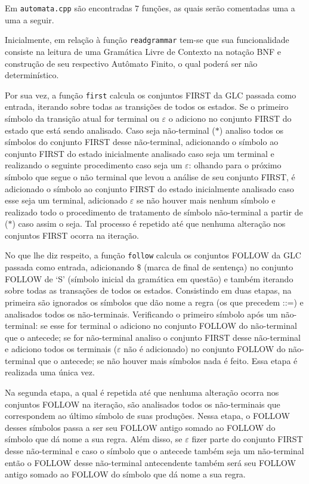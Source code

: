 \documentclass[12pt]{article}
\theoremstyle{definition}
\begin{document}
Em \texttt{automata.cpp} são encontradas  $7$ funções, as quais serão comentadas uma a uma a seguir.

Inicialmente, em relação à função \texttt{readgrammar} tem-se que sua funcionalidade consiste na leitura de uma Gramática Livre de Contexto na notação BNF e construção de seu respectivo Autômato Finito, o qual poderá ser não determinístico.

Por sua vez, a função \texttt{first} calcula os conjuntos FIRST da GLC passada como entrada, iterando sobre todas as transições de todos os estados. Se o primeiro símbolo da transição atual for terminal ou $\varepsilon$ o adiciono no conjunto FIRST do estado que está sendo analisado. Caso seja não-terminal ($*$) analiso todos os símbolos do conjunto FIRST desse não-terminal, adicionando o símbolo ao conjunto FIRST do estado inicialmente analisado caso seja um terminal e realizando o seguinte procedimento caso seja um $\varepsilon$: olhando para o próximo símbolo que segue o não terminal que levou a análise de seu conjunto FIRST, é adicionado o símbolo ao conjunto FIRST do estado inicialmente analisado caso esse seja um terminal, adicionado $\varepsilon$ se não houver mais nenhum símbolo e realizado todo o procedimento de tratamento de símbolo não-terminal a partir de ($*$) caso assim o seja. Tal processo é repetido até que nenhuma alteração nos conjuntos FIRST ocorra na iteração.

No que lhe diz respeito, a função \texttt{follow} calcula os conjuntos FOLLOW da GLC passada como entrada, adicionando $\$$ (marca de final de sentença) no conjunto FOLLOW de `S' (símbolo inicial da gramática em questão) e também iterando sobre todas as transações de todos os estados. Consistindo em duas etapas, na primeira são ignorados os símbolos que dão nome a regra (os que precedem ::=) e analisados todos os não-terminais. Verificando o primeiro símbolo após um não-terminal: se esse for terminal o adiciono no conjunto FOLLOW do não-terminal que o antecede; se for não-terminal analiso o conjunto FIRST desse não-terminal e adiciono todos os terminais ($\varepsilon$ não é adicionado) no conjunto FOLLOW do não-terminal que o antecede; se não houver mais símbolos nada é feito. Essa etapa é realizada uma única vez.

Na segunda etapa, a qual é repetida até que nenhuma alteração ocorra nos conjuntos FOLLOW na iteração, são analisados todos os não-terminais que correspondem ao último símbolo de suas produções. Nessa etapa, o FOLLOW desses símbolos passa a ser seu FOLLOW antigo somado ao FOLLOW do símbolo que dá nome a sua regra. Além disso, se $\varepsilon$ fizer parte do conjunto FIRST desse não-terminal e caso o símbolo que o antecede também seja um não-terminal então o FOLLOW desse não-terminal antecendente também será seu FOLLOW antigo somado ao FOLLOW do símbolo que dá nome a sua regra.
\end{document}
